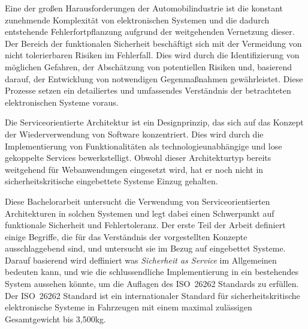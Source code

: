 Eine der großen Harausforderungen der Automobilindustrie ist die konstant zunehmende Komplexität von elektronischen Systemen und die dadurch entstehende Fehlerfortpflanzung aufgrund der weitgehenden Vernetzung dieser. Der Bereich der funktionalen Sicherheit beschäftigt sich mit der Vermeidung von nicht tolerierbaren Risiken im Fehlerfall. Dies wird durch die Identifizierung von möglichen Gefahren, der Abschätzung von potentiellen Risiken und, basierend darauf, der Entwicklung von notwendigen Gegenmaßnahmen gewährleistet. Diese Prozesse setzen ein detailiertes und umfassendes Verständnis der betrachteten elektronischen Systeme voraus.

Die Serviceorientierte Architektur ist ein Designprinzip, das sich auf das Konzept der Wiederverwendung von Software konzentriert. Dies wird durch die Implementierung von Funktionalitäten als technologieunabhängige und lose gekoppelte Services bewerkstelligt. Obwohl dieser Architekturtyp bereits weitgehend für Webanwendungen eingesetzt wird, hat er noch nicht in sicherheitskritische eingebettete Systeme Einzug gehalten.

Diese Bachelorarbeit untersucht die Verwendung von Serviceorientierten Architekturen in solchen Systemen und legt dabei einen Schwerpunkt auf funktionale Sicherheit und Fehlertoleranz. Der erste Teil der Arbeit definiert einige Begriffe, die für das Verständnis der vorgestellten Konzepte ausschlaggebend sind, und untersucht sie im Bezug auf eingebettet Systeme. Darauf basierend wird deffiniert was \emph{Sicherheit as Service} im Allgemeinen bedeuten kann, und wie die schlussendliche Implementierung in ein bestehendes System aussehen könnte, um die Auflagen des \mbox{ISO 26262} Standards zu erfüllen. Der \mbox{ISO 26262} Standard ist ein internationaler Standard für sicherheitskritische elektronische Systeme in Fahrzeugen mit einem maximal zulässigen Gesamtgewicht bis 3,500kg.